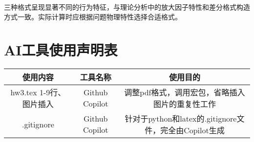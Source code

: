 \documentclass[UTF8]{ctexart}
\begin{document}
三种格式呈现显著不同的行为特征，与理论分析中的放大因子特性和差分格式构造方式一致。实际计算时应根据问题物理特性选择合适格式。
\newpage
\appendix
\section{AI工具使用声明表}
\begin{table}[H]
    \centering
    \begin{tabular}{c|c|c}
        \hline
        使用内容 & 工具名称 & 使用目的 \\ \hline
        hw3.tex 1-9行、图片插入 & Github Copilot & 调整pdf格式，调用宏包，省略插入图片的重复性工作 \\ 
        .gitignore & Github Copilot & 针对于python和latex的.gitignore文件，完全由Copilot生成  
    \end{tabular}
    \label{tab:AI_tools}
\end{table}
\end{document}
